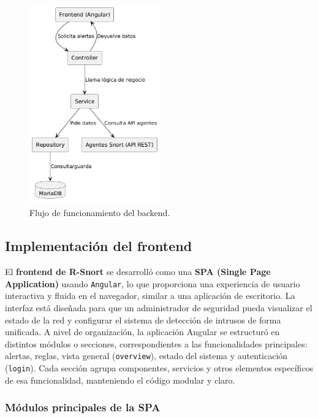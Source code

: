 \documentclass[11pt,a4paper,twoside]{report}
\begin{document}
\begin{figure}[htb]
	\centering
	\includegraphics[width=0.5\textwidth]{documento/27.png}
	\caption{Flujo de funcionamiento del backend.}
	\label{fig:esquema-backend}
\end{figure}

\newpage

\subsection{Implementación del frontend}

El \textbf{frontend de R-Snort} se desarrolló como una \textbf{SPA (Single Page Application)} usando \texttt{Angular}, lo que proporciona una experiencia de usuario interactiva y fluida en el navegador, similar a una aplicación de escritorio. La interfaz está diseñada para que un administrador de seguridad pueda visualizar el estado de la red y configurar el sistema de detección de intrusos de forma unificada. A nivel de organización, la aplicación Angular se estructuró en distintos módulos o secciones, correspondientes a las funcionalidades principales: alertas, reglas, vista general (\texttt{overview}), estado del sistema y autenticación (\texttt{login}). Cada sección agrupa componentes, servicios y otros elementos específicos de esa funcionalidad, manteniendo el código modular y claro.

\subsubsection*{Módulos principales de la SPA}
\end{document}
